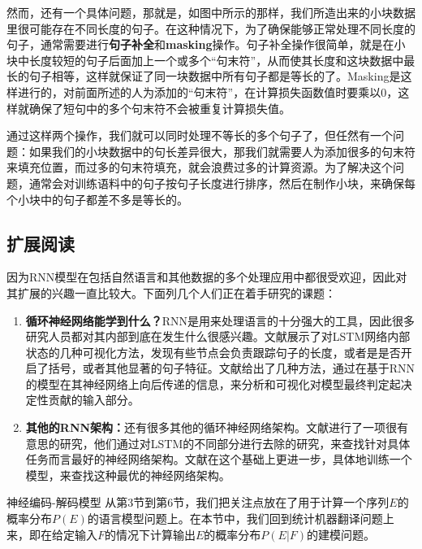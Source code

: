 \documentclass[10pt,a4paper]{ctexart}
\makeatletter
\renewcommand{\section}{\@startsection{section}{1}{0mm}
  {-\baselineskip}{0.5\baselineskip}{\bf\leftline}}
\makeatother
\begin{document}
然而，还有一个具体问题，那就是，如图中所示的那样，我们所造出来的小块数据里很可能存在不同长度的句子。在这种情况下，为了确保能够正常处理不同长度的句子，通常需要进行\textbf{句子补全}和\textbf{masking}操作。句子补全操作很简单，就是在小块中长度较短的句子后面加上一个或多个“句末符”，从而使其长度和这块数据中最长的句子相等，这样就保证了同一块数据中所有句子都是等长的了。Masking是这样进行的，对前面所述的人为添加的“句末符”，在计算损失函数值时要乘以0，这样就确保了短句中的多个句末符不会被重复计算损失值。

通过这样两个操作，我们就可以同时处理不等长的多个句子了，但任然有一个问题：如果我们的小块数据中的句长差异很大，那我们就需要人为添加很多的句末符来填充位置，而过多的句末符填充，就会浪费过多的计算资源。为了解决这个问题，通常会对训练语料中的句子按句子长度进行排序，然后在制作小块，来确保每个小块中的句子都差不多是等长的。

\subsection{扩展阅读}
因为RNN模型在包括自然语言和其他数据的多个处理应用中都很受欢迎，因此对其扩展的兴趣一直比较大。下面列几个人们正在着手研究的课题：
\begin{enumerate}
\item[] \textbf{循环神经网络能学到什么？}RNN是用来处理语言的十分强大的工具，因此很多研究人员都对其内部到底在发生什么很感兴趣。文献\cite{karpathy2015visualizing}展示了对LSTM网络内部状态的几种可视化方法，发现有些节点会负责跟踪句子的长度，或者是是否开启了括号，或者其他显著的句子特征。文献\cite{li2015visualizing}给出了几种方法，通过在基于RNN的模型在其神经网络上向后传递的信息，来分析和可视化对模型最终判定起决定性贡献的输入部分。
\item[] \textbf{其他的RNN架构：}还有很多其他的循环神经网络架构。文献\cite{greff2016lstm}进行了一项很有意思的研究，他们通过对LSTM的不同部分进行去除的研究，来查找针对具体任务而言最好的神经网络架构。文献\cite{zoph2016neural}在这个基础上更进一步，具体地训练一个模型，来查找这种最优的神经网络架构。
\end{enumerate}



\section{神经编码-解码模型}
从第3节到第6节，我们把关注点放在了用于计算一个序列$E$的概率分布$P(E)$的语言模型问题上。在本节中，我们回到统计机器翻译问题上来，即在给定输入$F$的情况下计算输出$E$的概率分布$P(E | F)$的建模问题。
\end{document}
